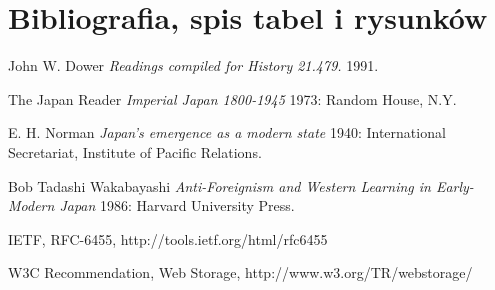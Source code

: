 \section{Bibliografia, spis tabel i rysunków}

\begin{thebibliography}{1}

 John W. Dower {\em Readings compiled for History
21.479.}  1991.

  The Japan Reader {\em Imperial Japan 1800-1945} 1973:
Random House, N.Y.

 E. H. Norman {\em Japan's emergence as a modern
state} 1940: International Secretariat, Institute of Pacific
Relations.

 Bob Tadashi Wakabayashi {\em Anti-Foreignism and Western
Learning in Early-Modern Japan} 1986: Harvard University Press.

 IETF, RFC-6455, http://tools.ietf.org/html/rfc6455

 W3C Recommendation, Web Storage, http://www.w3.org/TR/webstorage/

\end{thebibliography}

\listoftables

\listoffigures

